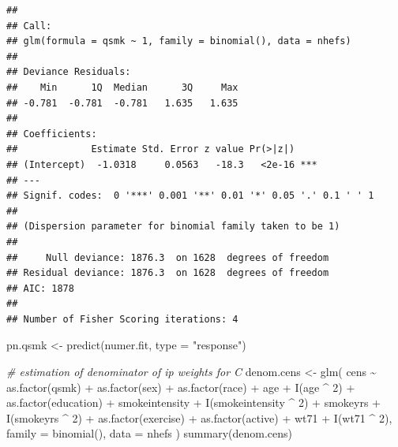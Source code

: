 \documentclass[
  10pt,
]{book}
\newenvironment{Shaded}{\begin{snugshade}}{\end{snugshade}}
\newcommand{\AttributeTok}[1]{\textcolor[rgb]{0.77,0.63,0.00}{#1}}
\newcommand{\CommentTok}[1]{\textcolor[rgb]{0.56,0.35,0.01}{\textit{#1}}}
\newcommand{\DecValTok}[1]{\textcolor[rgb]{0.00,0.00,0.81}{#1}}
\newcommand{\FunctionTok}[1]{\textcolor[rgb]{0.00,0.00,0.00}{#1}}
\newcommand{\NormalTok}[1]{#1}
\newcommand{\OtherTok}[1]{\textcolor[rgb]{0.56,0.35,0.01}{#1}}
\newcommand{\SpecialCharTok}[1]{\textcolor[rgb]{0.00,0.00,0.00}{#1}}
\newcommand{\StringTok}[1]{\textcolor[rgb]{0.31,0.60,0.02}{#1}}
\begin{document}
\begin{verbatim}
## 
## Call:
## glm(formula = qsmk ~ 1, family = binomial(), data = nhefs)
## 
## Deviance Residuals: 
##    Min      1Q  Median      3Q     Max  
## -0.781  -0.781  -0.781   1.635   1.635  
## 
## Coefficients:
##             Estimate Std. Error z value Pr(>|z|)    
## (Intercept)  -1.0318     0.0563   -18.3   <2e-16 ***
## ---
## Signif. codes:  0 '***' 0.001 '**' 0.01 '*' 0.05 '.' 0.1 ' ' 1
## 
## (Dispersion parameter for binomial family taken to be 1)
## 
##     Null deviance: 1876.3  on 1628  degrees of freedom
## Residual deviance: 1876.3  on 1628  degrees of freedom
## AIC: 1878
## 
## Number of Fisher Scoring iterations: 4
\end{verbatim}

\begin{Shaded}
\begin{Highlighting}[]
\NormalTok{pn.qsmk }\OtherTok{\textless{}{-}} \FunctionTok{predict}\NormalTok{(numer.fit, }\AttributeTok{type =} \StringTok{"response"}\NormalTok{)}

\CommentTok{\# estimation of denominator of ip weights for C}
\NormalTok{denom.cens }\OtherTok{\textless{}{-}} \FunctionTok{glm}\NormalTok{(}
\NormalTok{  cens }\SpecialCharTok{\textasciitilde{}} \FunctionTok{as.factor}\NormalTok{(qsmk) }\SpecialCharTok{+} \FunctionTok{as.factor}\NormalTok{(sex) }\SpecialCharTok{+}
    \FunctionTok{as.factor}\NormalTok{(race) }\SpecialCharTok{+}\NormalTok{ age }\SpecialCharTok{+} \FunctionTok{I}\NormalTok{(age }\SpecialCharTok{\^{}} \DecValTok{2}\NormalTok{) }\SpecialCharTok{+}
    \FunctionTok{as.factor}\NormalTok{(education) }\SpecialCharTok{+}\NormalTok{ smokeintensity }\SpecialCharTok{+}
    \FunctionTok{I}\NormalTok{(smokeintensity }\SpecialCharTok{\^{}} \DecValTok{2}\NormalTok{) }\SpecialCharTok{+}\NormalTok{ smokeyrs }\SpecialCharTok{+} \FunctionTok{I}\NormalTok{(smokeyrs }\SpecialCharTok{\^{}} \DecValTok{2}\NormalTok{) }\SpecialCharTok{+}
    \FunctionTok{as.factor}\NormalTok{(exercise) }\SpecialCharTok{+} \FunctionTok{as.factor}\NormalTok{(active) }\SpecialCharTok{+}\NormalTok{ wt71 }\SpecialCharTok{+} \FunctionTok{I}\NormalTok{(wt71 }\SpecialCharTok{\^{}} \DecValTok{2}\NormalTok{),}
  \AttributeTok{family =} \FunctionTok{binomial}\NormalTok{(),}
  \AttributeTok{data =}\NormalTok{ nhefs}
\NormalTok{)}
\FunctionTok{summary}\NormalTok{(denom.cens)}
\end{Highlighting}
\end{Shaded}
\end{document}
